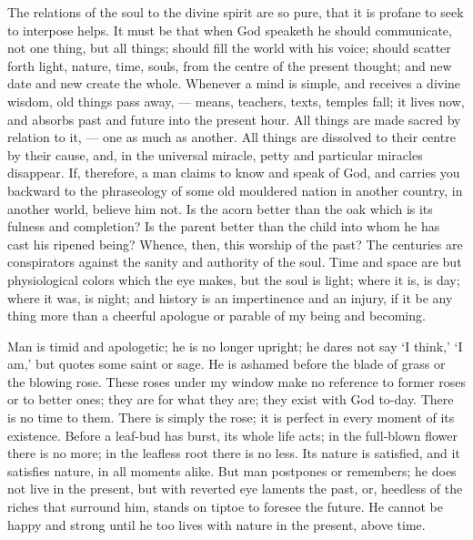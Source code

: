 \documentclass[12pt]{article}
\begin{document}
The relations of the soul to the divine spirit are so pure, that it is
profane to seek to interpose helps. It must be that when God speaketh he
should communicate, not one thing, but all things; should fill the world
with his voice; should scatter forth light, nature, time, souls, from the
centre of the present thought; and new date and new create the whole.
Whenever a mind is simple, and receives a divine wisdom, old things pass
away, --- means, teachers, texts, temples fall; it lives now, and absorbs
past and future into the present hour. All things are made sacred by
relation to it, --- one as much as another. All things are dissolved to their
centre by their cause, and, in the universal miracle, petty and particular
miracles disappear. If, therefore, a man claims to know and speak of God,
and carries you backward to the phraseology of some old mouldered nation in
another country, in another world, believe him not. Is the acorn better than
the oak which is its fulness and completion? Is the parent better than the
child into whom he has cast his ripened being? Whence, then, this worship of
the past? The centuries are conspirators against the sanity and authority of
the soul. Time and space are but physiological colors which the eye makes,
but the soul is light; where it is, is day; where it was, is night; and
history is an impertinence and an injury, if it be any thing more than a
cheerful apologue or parable of my being and becoming.

Man is timid and apologetic; he is no longer upright; he dares not say `I
think,' `I am,' but quotes some saint or sage. He is ashamed before the
blade of grass or the blowing rose. These roses under my window make no
reference to former roses or to better ones; they are for what they are;
they exist with God to-day. There is no time to them. There is simply the
rose; it is perfect in every moment of its existence. Before a leaf-bud has
burst, its whole life acts; in the full-blown flower there is no more; in
the leafless root there is no less. Its nature is satisfied, and it
satisfies nature, in all moments alike. But man postpones or remembers; he
does not live in the present, but with reverted eye laments the past, or,
heedless of the riches that surround him, stands on tiptoe to foresee the
future. He cannot be happy and strong until he too lives with nature in the
present, above time.
\end{document}
